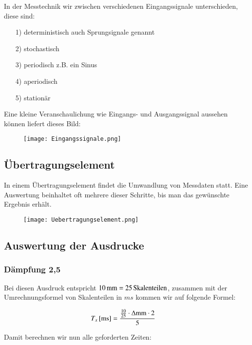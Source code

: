 In der Messtechnik wir zwischen verschiedenen Eingangssignale unterschieden, diese sind:

\begin{itemize}
\item[1)] deterministisch auch Sprungsignale genannt
\item[2)] stochastisch
\item[3)] periodisch z.B. ein Sinus
\item[4)] aperiodisch
\item[5)] stationär
\end{itemize}

Eine kleine Veranschaulichung wie Eingangs- und Ausgangssignal aussehen können liefert dieses Bild:

\begin{figure}[h]
\centering
\texttt{[image: Eingangssignale.png]}
\end{figure}


\subsection{Übertragungselement}

In einem Übertragungselement findet die Umwandlung von Messdaten statt. Eine Auswertung beinhaltet oft mehrere dieser Schritte, bis man das gewünschte Ergebnis erhält.

\begin{figure}[h]
\centering
\texttt{[image: Uebertragungselement.png]}
\end{figure}




\subsection{Auswertung der Ausdrucke}


\subsubsection*{Dämpfung 2,5}

Bei diesen Ausdruck entspricht $\unit[10]{mm} = \unit[25]{Skalenteilen}$, zusammen mit der Umrechnungsformel von Skalenteilen in $ms$ kommen wir auf folgende Formel:

\begin{align*}
\unit[T_x]{[ms]} &= \frac{ \frac{10}{25} \cdot \Delta \text{mm} \cdot 2}{5}
\end{align*}

Damit berechnen wir nun alle geforderten Zeiten:


